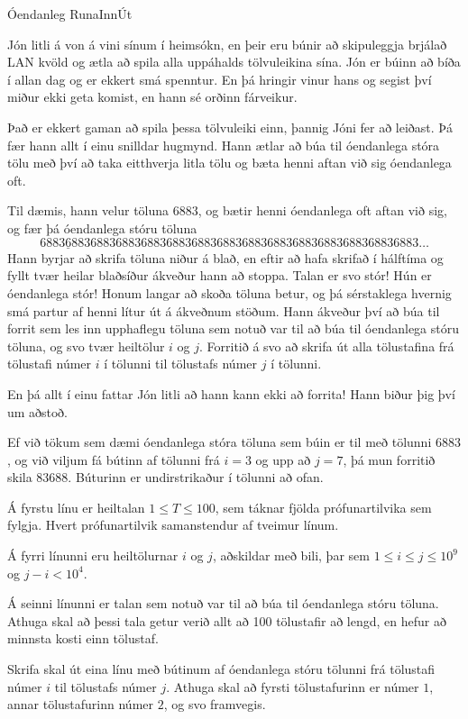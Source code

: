 \begin{problem}{Óendanleg Runa}{Inn}{Út}{~}{~}

	Jón litli á von á vini sínum í heimsókn, en þeir eru búnir að skipuleggja brjálað LAN kvöld og ætla að spila alla uppáhalds tölvuleikina sína. Jón er búinn að bíða í allan dag og er ekkert smá spenntur. En þá hringir vinur hans og segist því miður ekki geta komist, en hann sé orðinn fárveikur.

	Það er ekkert gaman að spila þessa tölvuleiki einn, þannig Jóni fer að leiðast. Þá fær hann allt í einu snilldar hugmynd. Hann ætlar að búa til óendanlega stóra tölu með því að taka eitthverja litla tölu og bæta henni aftan við sig óendanlega oft.

	Til dæmis, hann velur töluna $6883$, og bætir henni óendanlega oft aftan við sig, og fær þá óendanlega stóru töluna
	\[ 68\underline{83688}36883688368836883688368836883688368836883688368836883\ldots \]
	Hann byrjar að skrifa töluna niður á blað, en eftir að hafa skrifað í hálftíma og fyllt tvær heilar blaðsíður ákveður hann að stoppa. Talan er svo stór! Hún er óendanlega stór! Honum langar að skoða töluna betur, og þá sérstaklega hvernig smá partur af henni lítur út á ákveðnum stöðum. Hann ákveður því að búa til forrit sem les inn upphaflegu töluna sem notuð var til að búa til óendanlega stóru töluna, og svo tvær heiltölur $i$ og $j$. Forritið á svo að skrifa út alla tölustafina frá tölustafi númer $i$ í tölunni til tölustafs númer $j$ í tölunni.

	En þá allt í einu fattar Jón litli að hann kann ekki að forrita! Hann biður þig því um aðstoð.

	Ef við tökum sem dæmi óendanlega stóra töluna sem búin er til með tölunni $6883$, og við viljum fá bútinn af tölunni frá $i = 3$ og upp að $j = 7$, þá mun forritið skila $83688$. Búturinn er undirstrikaður í tölunni að ofan.

	\Input

		Á fyrstu línu er heiltalan $1 \leq T \leq 100$, sem táknar fjölda prófunartilvika sem fylgja. Hvert prófunartilvik samanstendur af tveimur línum.

		Á fyrri línunni eru heiltölurnar $i$ og $j$, aðskildar með bili, þar sem $1 \leq i \leq j \leq 10^9$ og $j - i < 10^4$.

		Á seinni línunni er talan sem notuð var til að búa til óendanlega stóru töluna. Athuga skal að þessi tala getur verið allt að 100 tölustafir að lengd, en hefur að minnsta kosti einn tölustaf.

	\Output

		Skrifa skal út eina línu með bútinum af óendanlega stóru tölunni frá tölustafi númer $i$ til tölustafs númer $j$. Athuga skal að fyrsti tölustafurinn er númer $1$, annar tölustafurinn númer $2$, og svo framvegis.

	\Examples

		\begin{example}
		\end{example}

\end{problem}